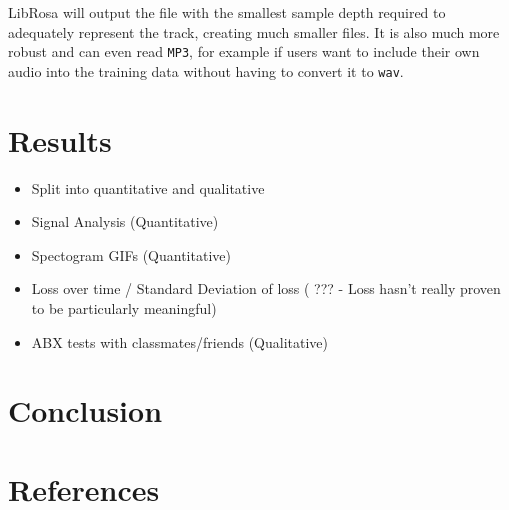 \documentclass{l4proj}
\providecommand{\tightlist}{%
  \setlength{\itemsep}{0pt}\setlength{\parskip}{0pt}}
\begin{document}
LibRosa will output the file with the smallest sample depth required to
adequately represent the track, creating much smaller files. It is also
much more robust and can even read \texttt{MP3}, for example if users
want to include their own audio into the training data without having to
convert it to \texttt{wav}.

\chapter{Results}\label{results}

\begin{itemize}
\tightlist
\item
  Split into quantitative and qualitative
\item
  Signal Analysis (Quantitative)
\item
  Spectogram GIFs (Quantitative)
\item
  Loss over time / Standard Deviation of loss ( ??? - Loss hasn't really
  proven to be particularly meaningful)
\item
  ABX tests with classmates/friends (Qualitative)
\end{itemize}

\chapter{Conclusion}\label{conclusion}

\chapter{References}\label{references}
\end{document}
